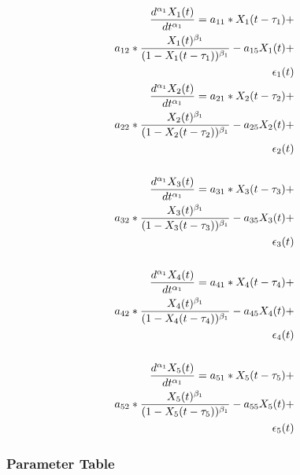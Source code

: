 \begin{align*} 
\tiny
\frac{d^{\alpha_1}X_1(t)}{dt^{\alpha_1}} = a_{11} *X_1(t - \tau_1) + \\
a_{12} *\frac{X_1(t)^{\beta_1}}{(1-X_1(t - \tau_1))^{\beta_1}} - a_{15}X_1(t) + \\
\epsilon_1(t) \\
\frac{d^{\alpha_1}X_2(t)}{dt^{\alpha_1}} = a_{21} *X_2(t - \tau_2) + \\
a_{22} *\frac{X_2(t)^{\beta_1}}{(1-X_2(t - \tau_2))^{\beta_1}} - a_{25}X_2(t) + \\
\epsilon_2(t) \\ \\
\frac{d^{\alpha_1}X_3(t)}{dt^{\alpha_1}} = a_{31} *X_3(t - \tau_3) + \\
a_{32} *\frac{X_3(t)^{\beta_1}}{(1-X_3(t - \tau_3))^{\beta_1}} - a_{35}X_3(t) + \\
\epsilon_3(t) \\ \\
\frac{d^{\alpha_1}X_4(t)}{dt^{\alpha_1}} = a_{41} *X_4(t - \tau_4) + \\
a_{42} *\frac{X_4(t)^{\beta_1}}{(1-X_4(t - \tau_4))^{\beta_1}} - a_{45}X_4(t) + \\
\epsilon_4(t) \\ \\
\frac{d^{\alpha_1}X_5(t)}{dt^{\alpha_1}} = a_{51} *X_5(t - \tau_5) + \\
a_{52} *\frac{X_5(t)^{\beta_1}}{(1-X_5(t - \tau_5))^{\beta_1}} - a_{55}X_5(t) + \\
\epsilon_5(t) \\
\end{align*}

\subsubsection{Parameter Table}

